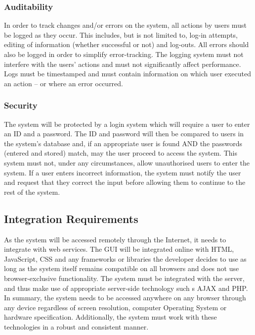 \documentclass[a4paper,12pt]{article}
\begin{document}
\subsubsection{Auditability}
In order to track changes and/or errors on the system, all actions by users must be logged as they occur. This includes, but is not limited to, log-in attempts, editing of information (whether successful or not) and log-outs. All errors should also be logged in order to simplify error-tracking. The logging system must not interfere with the users' actions and must not significantly affect performance. Logs must be timestamped and must contain information on which user executed an action – or where an error occurred.

\subsubsection{Security}
The system will be protected by a login system which will require a user to enter an ID and a password. The ID and password will then be compared to users in the system's database and, if an appropriate user is found AND the passwords (entered and stored) match, may the user proceed to access the system. This system must not, under any circumstances, allow unauthorised users to enter the system. If a user enters incorrect information, the system must notify the user and request that they correct the input before allowing them to continue to the rest of the system.

\newpage
\subsection{Integration Requirements}

As the system will be accessed remotely through the Internet, it needs to integrate with web services. The GUI will be integrated online with HTML, JavaScript, CSS and any frameworks or libraries the developer decides to use as long as the system itself remains compatible on all browsers and does not use browser-exclusive functionality. The system must be integrated with the server, and thus make use of appropriate server-side technology such s AJAX and PHP. In summary, the system needs to be accessed anywhere on any browser through any device regardless of screen resolution, computer Operating System or hardware specification. Additionally, the system must work with these technologies in a robust and consistent manner. 
\end{document}
